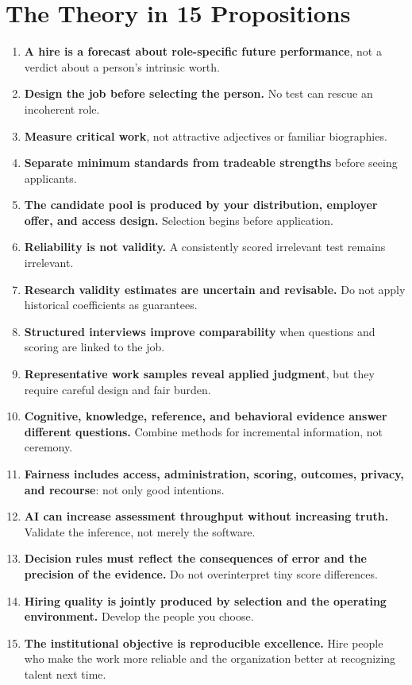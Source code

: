 \section*{The Theory in 15 Propositions}

\begin{enumerate}[leftmargin=*]
\item \textbf{A hire is a forecast about role-specific future performance}, not a verdict about a person's intrinsic worth.
\item \textbf{Design the job before selecting the person.} No test can rescue an incoherent role.
\item \textbf{Measure critical work}, not attractive adjectives or familiar biographies.
\item \textbf{Separate minimum standards from tradeable strengths} before seeing applicants.
\item \textbf{The candidate pool is produced by your distribution, employer offer, and access design.} Selection begins before application.
\item \textbf{Reliability is not validity.} A consistently scored irrelevant test remains irrelevant.
\item \textbf{Research validity estimates are uncertain and revisable.} Do not apply historical coefficients as guarantees.
\item \textbf{Structured interviews improve comparability} when questions and scoring are linked to the job.
\item \textbf{Representative work samples reveal applied judgment}, but they require careful design and fair burden.
\item \textbf{Cognitive, knowledge, reference, and behavioral evidence answer different questions.} Combine methods for incremental information, not ceremony.
\item \textbf{Fairness includes access, administration, scoring, outcomes, privacy, and recourse}: not only good intentions.
\item \textbf{AI can increase assessment throughput without increasing truth.} Validate the inference, not merely the software.
\item \textbf{Decision rules must reflect the consequences of error and the precision of the evidence.} Do not overinterpret tiny score differences.
\item \textbf{Hiring quality is jointly produced by selection and the operating environment.} Develop the people you choose.
\item \textbf{The institutional objective is reproducible excellence.} Hire people who make the work more reliable and the organization better at recognizing talent next time.
\end{enumerate}

